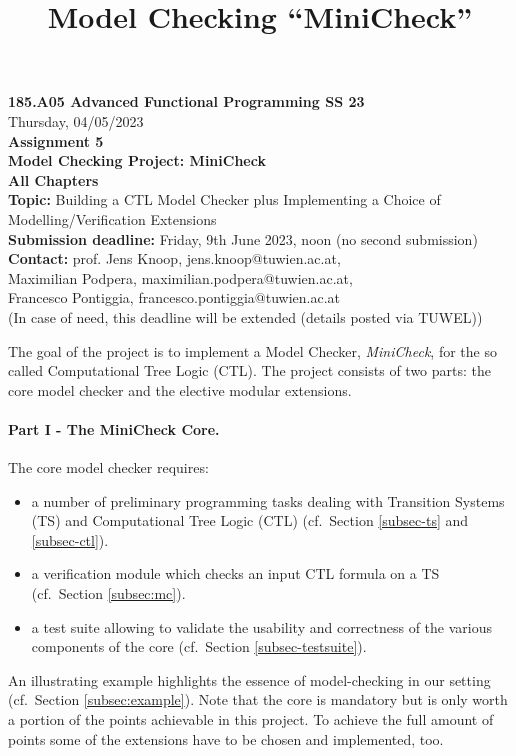 \documentclass{article}
\title{Model Checking ``MiniCheck''}
\begin{document}
\large
\thispagestyle{empty}
\begin{center}
  {\Large \textbf{185.A05 Advanced Functional Programming SS 23}}  \\ [1ex] 
            Thursday, 04/05/2023 \\
               {\Large \textbf{Assignment 5}} \\[.5ex]
              {\Large \textbf{Model Checking Project: MiniCheck}} \\[.5ex]
                 \textbf{All Chapters}  \\ [.75ex]
           \textbf{Topic:} Building a CTL Model Checker plus Implementing a Choice of Modelling/Verification Extensions  \\[1ex]
          \textbf{Submission deadline:} Friday, 9th June 2023, noon (no second submission)  \\ [0.5ex]
          \textbf{Contact:} prof. Jens Knoop, jens.knoop@tuwien.ac.at, \\
                            Maximilian Podpera, maximilian.podpera@tuwien.ac.at, \\
                            Francesco Pontiggia, francesco.pontiggia@tuwien.ac.at \\
                     (In case of need, this deadline will be extended (details posted via TUWEL))
\end{center}

\vspace{1ex}
\noindent
\noindent

\newcommand{\code}[1]{\texttt{#1}}

\noindent
The goal of the project is to implement a  Model Checker, \textit{MiniCheck}, 
for the so called Computational Tree Logic (CTL). 
The project consists of two parts: the core model checker and 
the elective modular extensions. 

\paragraph{Part I - The MiniCheck Core.} The core model checker requires: 
\begin{itemize}
    \item a number of preliminary programming tasks dealing with Transition Systems (TS)
          and Computational Tree Logic (CTL) (cf.~Section \ref{subsec-ts} and \ref{subsec-ctl}).
    \item a verification module which checks an input CTL formula on a TS (cf.~Section \ref{subsec:mc}).
    \item a test suite allowing to validate the usability and correctness of the
          various components of the core (cf.~Section \ref{subsec-testsuite}).
\end{itemize}  
An illustrating example highlights the essence of model-checking in our setting (cf.~Section \ref{subsec:example}). Note that the core is mandatory but is only worth a portion of the points achievable in this project. To achieve the full amount of points some of the extensions have to be chosen and implemented, too.
\end{document}
